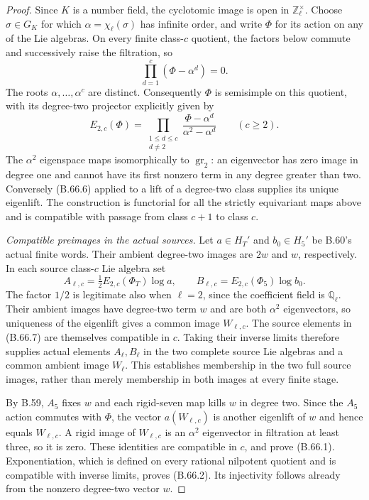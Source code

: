 \begin{proof}
Since $K$ is a number field, the cyclotomic image is
open in $\mathbb Z_\ell^\times$.
Choose $\sigma\in G_K$ for which
$\alpha=\chi_\ell(\sigma)$ has infinite order, and
write $\Phi$ for its action on any of the Lie algebras.
On every finite class-$c$ quotient, the factors below
commute and successively raise the filtration, so
\[
              \prod_{d=1}^c(\Phi-\alpha^d)=0.
                                                               \tag{B.66.5}
\]
The roots $\alpha,\ldots,\alpha^c$ are distinct.
Consequently $\Phi$ is semisimple on this quotient,
with its degree-two projector explicitly given by
\[
 E_{2,c}(\Phi)=
       \prod_{\substack{1\le d\le c\\d\ne2}}
            \frac{\Phi-\alpha^d}{\alpha^2-\alpha^d}
                 \qquad(c\ge2).
                                                               \tag{B.66.6}
\]
The $\alpha^2$ eigenspace maps isomorphically to
$\operatorname{gr}_2$: an eigenvector has zero image
in degree one and cannot have its first nonzero term
in any degree greater than two.  Conversely (B.66.6)
applied to a lift of a degree-two class supplies its
unique eigenlift.  The construction is functorial for
all the strictly equivariant maps above and is compatible
with passage from class $c+1$ to class $c$.

\emph{Compatible preimages in the actual sources.}
Let $a\in H_T'$ and $b_0\in H_5'$ be B.60's actual
finite words.  Their ambient degree-two images are
$2w$ and $w$, respectively.  In each source class-$c$
Lie algebra set
\[
 A_{\ell,c}=\tfrac12 E_{2,c}(\Phi_T)\log a,
 \qquad
 B_{\ell,c}=E_{2,c}(\Phi_5)\log b_0.
                                                               \tag{B.66.7}
\]
The factor $1/2$ is legitimate also when $\ell=2$,
since the coefficient field is $\mathbb Q_\ell$.
Their ambient images have degree-two term $w$ and
are both $\alpha^2$ eigenvectors, so uniqueness of
the eigenlift gives a common image $W_{\ell,c}$.
The source elements in (B.66.7) are themselves
compatible in $c$.  Taking their inverse limits
therefore supplies actual elements $A_\ell,B_\ell$
in the two complete source Lie algebras and a common
ambient image $W_\ell$.  This establishes membership
in the two full source images, rather than merely
membership in both images at every finite stage.

By B.59, $A_5$ fixes $w$ and each rigid-seven map
kills $w$ in degree two.  Since the $A_5$ action
commutes with $\Phi$, the vector $a(W_{\ell,c})$
is another eigenlift of $w$ and hence equals
$W_{\ell,c}$.  A rigid image of $W_{\ell,c}$ is an
$\alpha^2$ eigenvector in filtration at least three,
so it is zero.  These identities are compatible
in $c$, and prove (B.66.1).
Exponentiation, which is defined on every rational
nilpotent quotient and is compatible with inverse
limits, proves (B.66.2).  Its injectivity follows
already from the nonzero degree-two vector $w$.


\end{proof}
